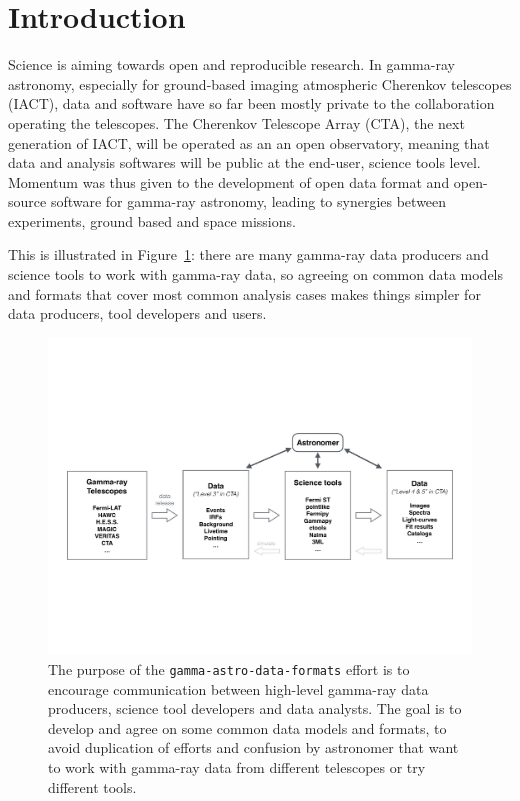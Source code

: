 \section{Introduction}

Science is aiming towards open and reproducible research. In gamma-ray astronomy, especially for ground-based imaging atmospheric Cherenkov telescopes (IACT), data and software have so far been mostly private to the collaboration operating the telescopes. The Cherenkov Telescope Array (CTA), the next generation of IACT, will be operated as an an open observatory, meaning that data and analysis softwares will be public at the end-user, science tools level. Momentum was thus given to the development of open data format and open-source software for gamma-ray astronomy, leading to synergies between experiments, ground based and space missions.

This is illustrated in Figure~\ref{fig:purpose}: there are many gamma-ray data producers and science tools to work with gamma-ray data, so agreeing on common data models and formats that cover most common analysis cases makes things simpler for data producers, tool developers and users.

\begin{figure}[tb]
\centerline{\includegraphics[width=\textwidth]{figures/purpose}}
\caption{
The purpose of the \texttt{gamma-astro-data-formats} effort is to encourage communication between high-level gamma-ray data producers, science tool developers and data analysts. The goal is to develop and agree on some common data models and formats, to avoid duplication of efforts and confusion by astronomer that want to work with gamma-ray data from different telescopes or try different tools.
}
\label{fig:purpose}
\end{figure}

